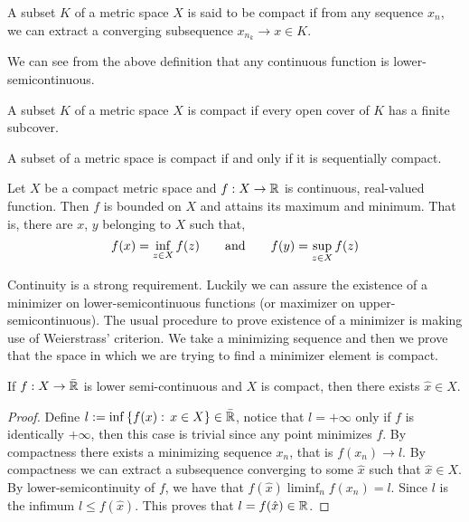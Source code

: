\begin{definition}
	A subset $K$ of a metric space $X$ is said to be compact if from any sequence $x_n$, we can extract a converging subsequence $x_{n_k} \rightarrow x \in K$.
\end{definition}
We can see from the above definition that any continuous function is lower-semicontinuous. 

\begin{definition}[Compactness]
		A subset $K$ of a metric space $X$ is compact if every open cover of $K$ has a finite subcover. 
\end{definition}

\begin{theorem}
	A subset of a metric space is compact if and only if it is sequentially compact.
\end{theorem}

\begin{theorem}
	Let $X$ be a compact metric space and $f: X\rightarrow \mathbb{R}$ is continuous, real-valued function. Then $f$ is bounded on $X$ and attains its maximum and minimum. That is, there are $x$, $y$ belonging to $X$ such that,
	\begin{equation*}
		f(x)=\inf_{z\in X}f(z) \qquad \mathrm{and} \qquad f(y)=\sup_{z \in X} f(z)
	\end{equation*}
\end{theorem}
Continuity is a strong requirement. Luckily we can assure the existence of a minimizer on lower-semicontinuous functions (or maximizer on upper-semicontinuous). The usual procedure to prove existence of a minimizer is making use of Weierstrass' criterion. We take a minimizing sequence and then we prove that the space in which we are trying to find a minimizer element is compact.
\begin{theorem}
	If $f: X\rightarrow\bar{\mathbb{R}}$ is lower semi-continuous and $X$ is compact, then there exists $\hat x \in X$.
	\begin{proof}
		Define $l:=\inf\left\lbrace f(x): \, x \in X \right\rbrace \in \bar{\mathbb{R}}$, notice that $l=+\infty$ only if $f$ is identically $+\infty$, then this case is trivial since any point minimizes $f$. By compactness there exists a minimizing sequence $x_n$, that is $f(x_n)\rightarrow l$. By compactness we can extract a subsequence converging to some $\hat x$ such that $\hat x \in X$. By lower-semicontinuity of $f$, we have that $f(\hat x)\liminf_n f(x_n)=l$. Since $l$ is the infimum $l\leq f(\hat x)$. This proves that $l=f(\hat{x}) \in \mathbb{R}$.
	\end{proof}
\end{theorem}

